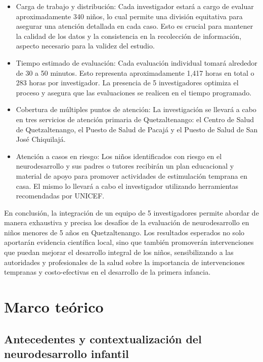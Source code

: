 \documentclass[11pt,letterpaper]{report}
\begin{document}
	\begin{itemize}
		\item Carga de trabajo y distribución: Cada investigador estará a cargo
		de evaluar aproximadamente 340 niños, lo cual permite una división
		equitativa para asegurar una atención detallada en cada caso. Esto es
		crucial para mantener la calidad de los datos y la consistencia en la
		recolección de información, aspecto necesario para la validez del
		estudio.
		\item Tiempo estimado de evaluación: Cada evaluación individual tomará
		alrededor de 30 a 50 minutos. Esto representa aproximadamente 1,417
		horas en total o 283 horas por investigador. La presencia de 5
		investigadores optimiza el proceso y asegura que las evaluaciones se
		realicen en el tiempo programado.
		\item Cobertura de múltiples puntos de atención: La investigación se
		llevará a cabo en tres servicios de atención primaria de
		Quetzaltenango: el Centro de Salud de Quetzaltenango, el Puesto de
		Salud de Pacajá y el Puesto de Salud de San José Chiquilajá.
		\item Atención a casos en riesgo: Los niños identificados con riesgo en
		el neurodesarrollo y sus padres o tutores recibirán un plan educacional
		y material de apoyo para promover actividades de estimulación temprana
		en casa. El mismo lo llevará a cabo el investigador utilizando
		herramientas recomendadas por UNICEF.
	\end{itemize}

En conclusión, la integración de un equipo de 5 investigadores permite abordar
de manera exhaustiva y precisa los desafíos de la evaluación de neurodesarrollo
en niños menores de 5 años en Quetzaltenango. Los resultados esperados no solo
aportarán evidencia científica local, sino que también promoverán
intervenciones que puedan mejorar el desarrollo integral de los niños,
sensibilizando a las autoridades y profesionales de la salud sobre la
importancia de intervenciones tempranas y costo-efectivas en el desarrollo de
la primera infancia.

	\chapter{Marco teórico}
\section{Antecedentes y contextualización del neurodesarrollo infantil}
\end{document}
